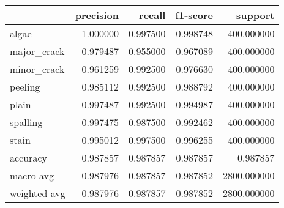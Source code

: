 \begin{tabular}{lrrrr}
\toprule
 & precision & recall & f1-score & support \\
\midrule
algae & 1.000000 & 0.997500 & 0.998748 & 400.000000 \\
major_crack & 0.979487 & 0.955000 & 0.967089 & 400.000000 \\
minor_crack & 0.961259 & 0.992500 & 0.976630 & 400.000000 \\
peeling & 0.985112 & 0.992500 & 0.988792 & 400.000000 \\
plain & 0.997487 & 0.992500 & 0.994987 & 400.000000 \\
spalling & 0.997475 & 0.987500 & 0.992462 & 400.000000 \\
stain & 0.995012 & 0.997500 & 0.996255 & 400.000000 \\
accuracy & 0.987857 & 0.987857 & 0.987857 & 0.987857 \\
macro avg & 0.987976 & 0.987857 & 0.987852 & 2800.000000 \\
weighted avg & 0.987976 & 0.987857 & 0.987852 & 2800.000000 \\
\bottomrule
\end{tabular}
